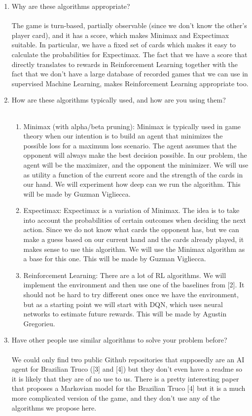 \documentclass{article}
\begin{document}
\begin{enumerate}
\item Why are these algorithms appropriate?
\\\\
The game is turn-based, partially observable (since we don’t know the other’s player card), and it has a score, which makes Minimax and Expectimax suitable. In particular, we have a fixed set of cards which makes it easy to calculate the probabilities for Expectimax. The fact that we have a score that directly translates to rewards in Reinforcement Learning together with the fact that we don’t have a large database of recorded games that we can use in supervised Machine Learning, makes Reinforcement Learning appropriate too.

\item How are these algorithms typically used, and how are you using them?
\\\\
\begin{enumerate}
	\item Minimax (with alpha/beta pruning): Minimax is typically used in game theory when our intention is to build an agent that minimizes the possible loss for a maximum loss scenario. The agent assumes that the opponent will always make the best decision possible. In our problem, the agent will be the maximizer, and the opponent the minimizer. We will use as utility a function of the current score and the strength of the cards in our hand. We will experiment how deep can we run the algorithm. This will be made by Guzman Vigliecca.
	\item Expectimax: Expectimax is a variation of Minimax. The idea is to take into account the probabilities of certain outcomes when deciding the next action. Since we do not know what cards the opponent has, but we can make a guess based on our current hand and the cards already played, it makes sense to use this algorithm. We will use the Minimax algorithm as a base for this one. This will be made by Guzman Vigliecca.
	\item Reinforcement Learning: There are a lot of RL algorithms. We will implement the environment and then use one of the baselines from [2]. It should not be hard to try different ones once we have the environment, but as a starting point we will start with DQN, which uses neural networks to estimate future rewards. This will be made by Agustin Gregorieu.
\end{enumerate}

\item Have other people use similar algorithms to solve your problem before?
\\\\
We could only find two public Github repositories that supposedly are an AI agent for Brazilian Truco ([3] and [4]) but they don’t even have a readme so it is likely that they are of no use to us. There is a pretty interesting paper that proposes a Markovian model for the Brazilian Truco [4] but it is a much more complicated version of the game, and they don’t use any of the algorithms we propose here.


\end{enumerate}
\end{document}
